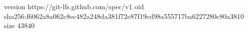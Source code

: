 version https://git-lfs.github.com/spec/v1
oid sha256:f6062a8a062c8ec482a248da381f72e87f19cd98a555717ba6227280c80a3810
size 43840
